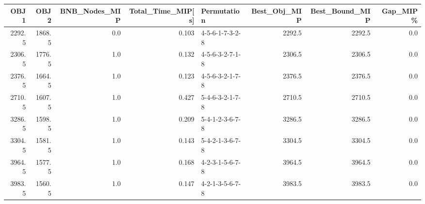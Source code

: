 \begin{tabular}{rrrrlrrr}
\toprule
   OBJ1 &    OBJ2 &  BNB\_Nodes\_MIP &  Total\_Time\_MIP[s] &      Permutation &  Best\_Obj\_MIP &  Best\_Bound\_MIP &  Gap\_MIP\% \\
\midrule
 2292.5 &  1868.5 &            0.0 &              0.103 &  4-5-6-1-7-3-2-8 &        2292.5 &          2292.5 &       0.0 \\
 2306.5 &  1776.5 &            1.0 &              0.132 &  4-5-6-3-2-7-1-8 &        2306.5 &          2306.5 &       0.0 \\
 2376.5 &  1664.5 &            1.0 &              0.123 &  4-5-6-3-2-1-7-8 &        2376.5 &          2376.5 &       0.0 \\
 2710.5 &  1607.5 &            1.0 &              0.427 &  5-4-6-3-2-1-7-8 &        2710.5 &          2710.5 &       0.0 \\
 3286.5 &  1598.5 &            1.0 &              0.209 &  5-4-1-2-3-6-7-8 &        3286.5 &          3286.5 &       0.0 \\
 3304.5 &  1581.5 &            1.0 &              0.143 &  5-4-2-1-3-6-7-8 &        3304.5 &          3304.5 &       0.0 \\
 3964.5 &  1577.5 &            1.0 &              0.168 &  4-2-3-1-5-6-7-8 &        3964.5 &          3964.5 &       0.0 \\
 3983.5 &  1560.5 &            1.0 &              0.147 &  4-2-1-3-5-6-7-8 &        3983.5 &          3983.5 &       0.0 \\
\bottomrule
\end{tabular}
